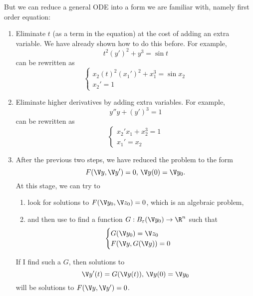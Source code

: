 \documentclass[a4paper]{article}
\theoremstyle{definition}
\begin{document}
But we can reduce a general ODE into a form we are familiar with, namely first order equation:
\begin{enumerate}
\item Eliminate \(t\) (as a term in the equation) at the cost of adding an extra variable. We have already shown how to do this before. For example,
  \[
    t^2(y')^2 + y^3 = \sin t
  \]
  can be rewritten as
  \[
    \begin{cases}
      x_2(t)^2(x_1')^2 + x_1^3 = \sin x_2 \\
      x_2' = 1
    \end{cases}
  \]
\item Eliminate higher derivatives by adding extra variables. For example,
  \[
    y''y+ (y')^3 = 1
  \]
  can be rewritten as
  \[
    \begin{cases}
      x_2'x_1 + x_2^3 = 1 \\
      x_1' = x_2
    \end{cases}
  \]
\item After the previous two steps, we have reduced the problem to the form
  \[
    F(\V y, \V y') = 0, \, \V y(0) = \V y_0.
  \]
  At this stage, we can try to
  \begin{enumerate}
  \item look for solutions to \(F(\V y_0, \V z_0) = 0\), which is an algebraic problem,
  \item and then use  to find a function \(G: B_\varepsilon(\V y_0) \to \R^n\) such that
    \[
     \begin{cases} 
       G(\V y_0) = \V z_0 \\
       F(\V y, G(\V y)) = 0
    \end{cases}
    \]
  \end{enumerate}
  If I find such a \(G\), then solutions to
  \[
    \V y'(t) = G(\V y(t)), \, \V y(0) = \V y_0
  \]
  will be solutions to \(F(\V y, \V y') = 0\).
\end{enumerate}

\printindex
\end{document}

